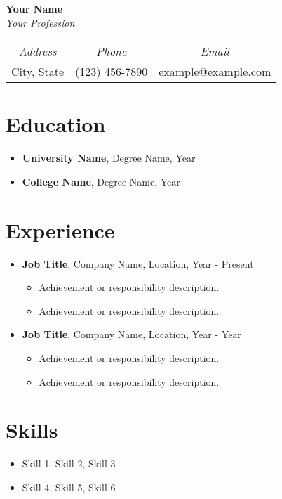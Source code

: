 \documentclass[a4paper,10pt]{article}
\begin{document}
\pagestyle{empty} %

\begin{center}
    \Huge \textbf{Your Name} \\
    \small \textit{Your Profession}
\end{center}

\begin{center}
    \begin{tabular}{ c c c }
        \textit{Address} & \textit{Phone} & \textit{Email} \\
        City, State & (123) 456-7890 & example@example.com
    \end{tabular}
\end{center}

\section*{Education}
\begin{itemize}[leftmargin=*]
    \item \textbf{University Name}, Degree Name, Year
    \item \textbf{College Name}, Degree Name, Year
\end{itemize}

\section*{Experience}
\begin{itemize}[leftmargin=*]
    \item \textbf{Job Title}, Company Name, Location, Year - Present
    \begin{itemize}
        \item Achievement or responsibility description.
        \item Achievement or responsibility description.
    \end{itemize}
    \item \textbf{Job Title}, Company Name, Location, Year - Year
    \begin{itemize}
        \item Achievement or responsibility description.
        \item Achievement or responsibility description.
    \end{itemize}
\end{itemize}

\section*{Skills}
\begin{itemize}[leftmargin=*]
    \item Skill 1, Skill 2, Skill 3
    \item Skill 4, Skill 5, Skill 6
\end{itemize}
\end{document}
